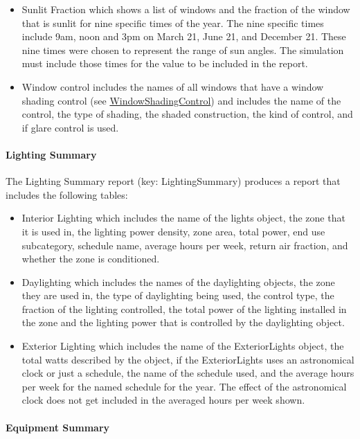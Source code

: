 \begin{itemize}
\item
  Sunlit Fraction which shows a list of windows and the fraction of the window that is sunlit for nine specific times of the year. The nine specific times include 9am, noon and 3pm on March 21, June 21, and December 21. These nine times were chosen to represent the range of sun angles. The simulation must include those times for the value to be included in the report.
\item
  Window control includes the names of all windows that have a window shading control (see \hyperref[windowpropertyshadingcontrol]{WindowShadingControl}) and includes the name of the control, the type of shading, the shaded construction, the kind of control, and if glare control is used.
\end{itemize}

\paragraph{Lighting Summary}\label{lighting-summary}

The Lighting Summary report (key: LightingSummary) produces a report that includes the following tables:

\begin{itemize}
\item
  Interior Lighting which includes the name of the lights object, the zone that it is used in, the lighting power density, zone area, total power, end use subcategory, schedule name, average hours per week, return air fraction, and whether the zone is conditioned.
\item
  Daylighting which includes the names of the daylighting objects, the zone they are used in, the type of daylighting being used, the control type, the fraction of the lighting controlled, the total power of the lighting installed in the zone and the lighting power that is controlled by the daylighting object.
\item
  Exterior Lighting which includes the name of the ExteriorLights object, the total watts described by the object, if the ExteriorLights uses an astronomical clock or just a schedule, the name of the schedule used, and the average hours per week for the named schedule for the year. The effect of the astronomical clock does not get included in the averaged hours per week shown.
\end{itemize}

\paragraph{Equipment Summary}\label{equipment-summary}

